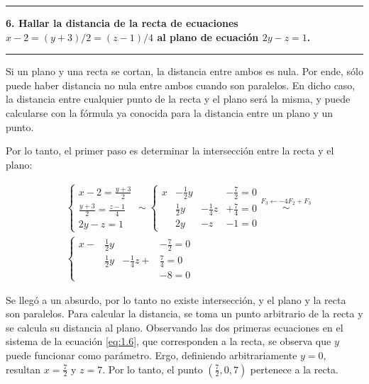 \documentclass{article}
\begin{document}
\hrule
\vspace{10 pt}
\textbf{6. Hallar la distancia de la recta de ecuaciones $x - 2 = (y + 3)/2 = (z-1)/4$ al plano de ecuación $2y -z = 1$.} 
\vspace{10 pt}
\hrule
\vspace{10 pt}

Si un plano y una recta se cortan, la distancia entre ambos es nula. Por ende, sólo puede haber distancia no nula entre ambos cuando son paralelos. En dicho caso, la distancia entre cualquier punto de la recta y el plano será la misma, y puede calcularse con la fórmula ya conocida para la distancia entre un plano y un punto.

Por lo tanto, el primer paso es determinar la intersección entre la recta y el plano:

\begin{subequations}
\begin{align}
& \left\{ \begin{array}{ll}
x-2 = \frac{y+3}{2} \\
\frac{y+3}{2} = \frac{z - 1}{4} \\
2y -z = 1
\end{array} \right. \sim \left\{ \begin{array}{lllr}
x&-\frac{1}{2}y & &- \frac{7}{2} = 0 \\
&\frac{1}{2}y &-\frac{1}{4}z &+ \frac{7}{4} = 0 \label{eq:1.6} \\
&2y &- z &- 1 = 0
\end{array} \right. \overset{F_3 \leftarrow -4 F_2 + F_3}{\sim} \\
& \left\{ \begin{array}{lllr}
x -&\frac{1}{2} y &&-\frac{7}{2} = 0 \\
&\frac{1}{2} y &-\frac{1}{4}z + &\frac{7}{4} = 0 \\
&&&-8 = 0
\end{array} \right.
\end{align}
\end{subequations}

Se llegó a un absurdo, por lo tanto no existe intersección, y el plano y la recta son paralelos. Para calcular la distancia, se toma un punto arbitrario de la recta y se calcula su distancia al plano. Observando las dos primeras ecuaciones en el sistema de la ecuación \ref{eq:1.6}, que corresponden a la recta, se observa que $y$ puede funcionar como parámetro. Ergo, definiendo arbitrariamente $y = 0$, resultan $x=\frac{7}{2}$ y $z=7$. Por lo tanto, el punto $(\frac{7}{2}, 0, 7)$ pertenece a la recta.
\end{document}
